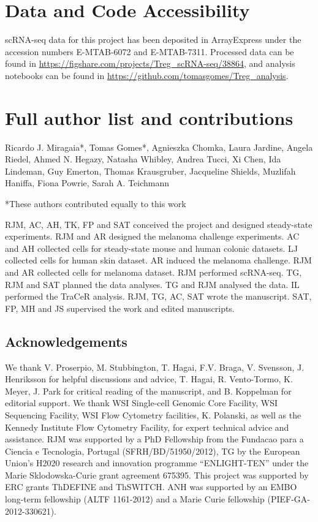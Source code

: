 \pagebreak
\section{Data and Code Accessibility}
\label{sectionA1.3}
scRNA-seq data for this project has been deposited in ArrayExpress under the accession numbers E-MTAB-6072 and E-MTAB-7311. Processed data can be found in \url{https://figshare.com/projects/Treg\_scRNA-seq/38864}, and analysis notebooks can be found in \url{https://github.com/tomasgomes/Treg\_analysis}.


\section{Full author list and contributions}
\label{sectionA1.4}
Ricardo J. Miragaia*, Tomas Gomes*, Agnieszka Chomka, Laura Jardine, Angela Riedel, Ahmed N. Hegazy, Natasha Whibley, Andrea Tucci, Xi Chen, Ida Lindeman, Guy Emerton, Thomas Krausgruber, Jacqueline Shields, Muzlifah Haniffa, Fiona Powrie, Sarah A. Teichmann

*These authors contributed equally to this work

RJM, AC, AH, TK, FP and SAT conceived the project and designed steady-state experiments. RJM and AR designed the melanoma challenge experiments. AC and AH collected cells for steady-state mouse and human colonic datasets. LJ collected cells for human skin dataset. AR induced the melanoma challenge. RJM and AR collected cells for melanoma dataset. RJM performed scRNA-seq. TG, RJM and SAT planned the data analyses. TG and RJM analysed the data. IL performed the TraCeR analysis. RJM, TG, AC, SAT wrote the manuscript. SAT, FP, MH and JS supervised the work and edited manuscripts.

\subsection{Acknowledgements}
We thank V. Proserpio, M. Stubbington, T. Hagai, F.V. Braga, V. Svensson, J. Henriksson for helpful discussions and advice, T. Hagai, R. Vento-Tormo, K. Meyer, J. Park for critical reading of the manuscript, and B. Koppelman for editorial support. We thank WSI Single-cell Genomic Core Facility, WSI Sequencing Facility, WSI Flow Cytometry facilities, K. Polanski, as well as the Kennedy Institute Flow Cytometry Facility, for expert technical advice and assistance. RJM was supported by a PhD Fellowship from the Fundacao para a Ciencia e Tecnologia, Portugal (SFRH/BD/51950/2012), TG by the European Union’s H2020 research and innovation programme “ENLIGHT-TEN” under the Marie Sklodowska-Curie grant agreement 675395. This project was supported by ERC grants ThDEFINE and ThSWITCH. ANH was supported by an EMBO long-term fellowship (ALTF 1161-2012) and a Marie Curie fellowship (PIEF-GA-2012-330621).